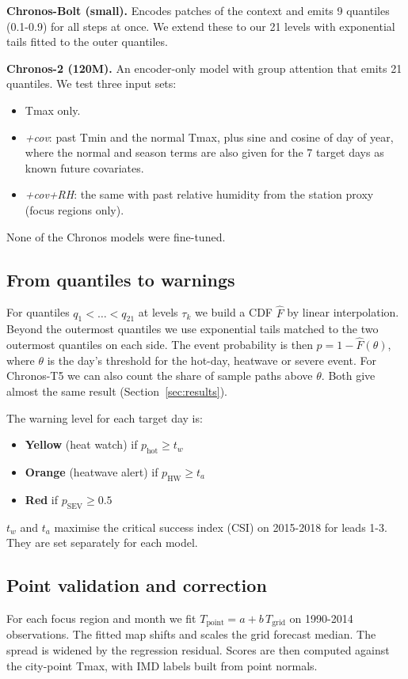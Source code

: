 \documentclass[conference,10pt]{IEEEtran}
\begin{document}
\textbf{Chronos-Bolt (small).} Encodes patches of the context and emits 9 quantiles (0.1-0.9) for all steps at once. We extend these to our 21 levels with exponential tails fitted to the outer quantiles.

\textbf{Chronos-2 (120M).} An encoder-only model with group attention that emits 21 quantiles. We test three input sets:
\begin{itemize}
\item Tmax only.
\item \emph{+cov}: past Tmin and the normal Tmax, plus sine and cosine of day of year, where the normal and season terms are also given for the 7 target days as known future covariates.
\item \emph{+cov+RH}: the same with past relative humidity from the station proxy (focus regions only).
\end{itemize}

None of the Chronos models were fine-tuned.

\subsection{From quantiles to warnings}
For quantiles $q_1<\dots<q_{21}$ at levels $\tau_k$ we build a CDF $\hat F$ by linear interpolation. Beyond the outermost quantiles we use exponential tails matched to the two outermost quantiles on each side. The event probability is then $p=1-\hat F(\theta)$, where $\theta$ is the day's threshold for the hot-day, heatwave or severe event. For Chronos-T5 we can also count the share of sample paths above $\theta$. Both give almost the same result (Section~\ref{sec:results}).

The warning level for each target day is:
\begin{itemize}
\item \textbf{Yellow} (heat watch) if $p_{\text{hot}}\ge t_w$
\item \textbf{Orange} (heatwave alert) if $p_{\text{HW}}\ge t_a$
\item \textbf{Red} if $p_{\text{SEV}}\ge 0.5$
\end{itemize}
$t_w$ and $t_a$ maximise the critical success index (CSI) on 2015-2018 for leads 1-3. They are set separately for each model.

\subsection{Point validation and correction}
For each focus region and month we fit $T_{\text{point}}=a+b\,T_{\text{grid}}$ on 1990-2014 observations. The fitted map shifts and scales the grid forecast median. The spread is widened by the regression residual. Scores are then computed against the city-point Tmax, with IMD labels built from point normals.
\end{document}
